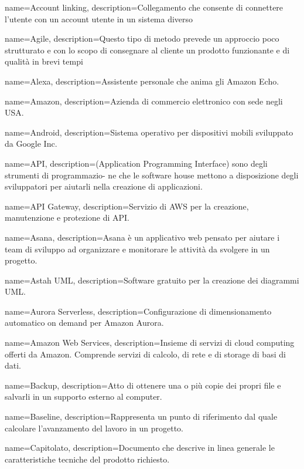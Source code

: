 {
name={Account linking},
description={Collegamento che consente di connettere l’utente con un account utente in
un sistema diverso}
}

{
name={Agile},
description={Questo tipo di metodo prevede un approccio poco strutturato e con lo scopo di consegnare al cliente un prodotto funzionante e di qualità in brevi tempi}
}

{
name={Alexa},
description={Assistente personale che anima gli Amazon Echo.}
}

{
name={Amazon},
description={Azienda di commercio elettronico con sede negli USA.}
}

{
name={Android},
description={Sistema operativo per dispositivi mobili sviluppato da Google Inc.}
}

{
name={API},
description={(Application Programming Interface) sono degli strumenti di programmazio-
ne che le software house mettono a disposizione degli sviluppatori per aiutarli
nella creazione di applicazioni.}
}

{
name={API Gateway},
description={Servizio di AWS per la creazione, manutenzione e protezione di API.}
}

{
name={Asana},
description={Asana è un applicativo web pensato per aiutare i team di sviluppo ad organizzare e monitorare le attività da svolgere in un progetto.}
}

{
name={Astah UML},
description={Software gratuito per la creazione dei diagrammi UML.}
}

{
name={Aurora Serverless},
description={Configurazione di dimensionamento automatico on demand per Amazon Aurora.}
}

{
name={Amazon Web Services},
description={Insieme di servizi di cloud computing offerti da Amazon. Comprende servizi di calcolo, di rete e di storage di basi di dati.}
}

{
name={Backup},
description={Atto di ottenere una o più copie dei propri file e salvarli in un supporto esterno al computer.}
}

{
name={Baseline},
description={Rappresenta un punto di riferimento dal quale calcolare l’avanzamento del lavoro in un progetto.}
}

{
name={Capitolato},
description={Documento che descrive in linea generale le caratteristiche tecniche del prodotto richiesto.}
}

